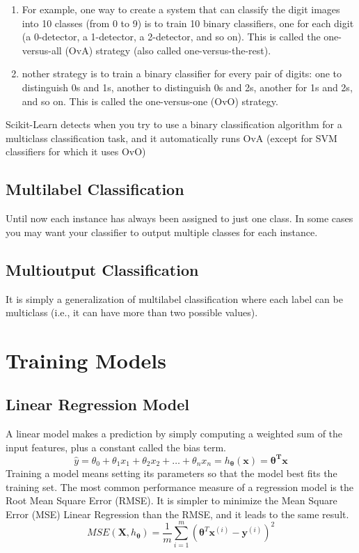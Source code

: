 \documentclass[french]{article}
\begin{document}
\begin{enumerate}
    \item For example, one way to create a system that can classify the digit images into 10 classes (from 0 to 9) is to train 10 binary classifiers, one for each digit (a 0-detector, a 1-detector, a 2-detector, and so on). This is called the one-versus-all (OvA) strategy (also called one-versus-the-rest).
    \item nother strategy is to train a binary classifier for every pair of digits: one to distinguish 0s and 1s, another to distinguish 0s and 2s, another for 1s and 2s, and so on. This is called the one-versus-one (OvO) strategy.
\end{enumerate}

Scikit-Learn detects when you try to use a binary classification algorithm for a multiclass classification task, and it automatically runs OvA (except for SVM classifiers for which it uses OvO) 

\subsection{Multilabel Classification}

Until now each instance has always been assigned to just one class. In some cases you may want your classifier to output multiple classes for each instance.

\subsection{Multioutput Classification}

It is simply a generalization of multilabel classification where each label can be multiclass (i.e., it can have more than two possible values).

\section{Training Models}

\subsection{Linear Regression Model}

A linear model makes a prediction by simply computing a weighted sum of the input features, plus a constant called the bias term.
\[\hat y = \theta_0 + \theta_1 x_1 + \theta_2 x_2 + \dots + \theta_n x_n = h_{\bm{\theta}}(\bm{x}) = \bm{\theta^T} \bm{x}\]
Training a model means setting its parameters so that the model best fits the training set. The most common performance measure of a regression model is the Root Mean Square Error (RMSE). It is simpler to minimize the Mean Square Error (MSE) Linear Regression than the RMSE, and it leads to the same result.
\[ MSE(\bm{X}, h_{\bm{\theta}}) = \frac{1}{m} \sum_{i=1}^m (\bm{\theta}^T\bm{x}^{(i)} - \bm{y}^{(i)}  )^2\]
\end{document}
